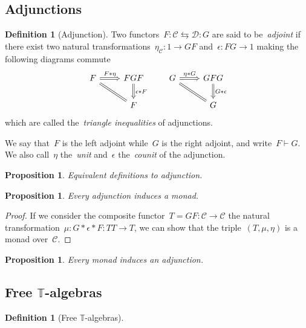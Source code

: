 \documentclass[a4paper]{article}
\theoremstyle{plain}
\newtheorem{proposition}[theorem]{Proposition}
\theoremstyle{definition}
\newtheorem{definition}[theorem]{Definition}
\newcommand{\adjoint}{\mathrel{\vdash}}
\newcommand{\cat}[1]{\mathcal{#1}}
\begin{document}
\subsection{Adjunctions}
\begin{definition}[Adjunction]
    Two functors~\(F:\cat{C}\leftrightarrows\cat{D}:G\) are said to
    be~\emph{adjoint} if there exist two natural
    transformations~\(\eta_{\cat{C}}:1\longrightarrow GF\)
    and~\(\epsilon:FG\longrightarrow 1\) making the following diagrams commute
    \[
        \begin{tikzcd}
            F \arrow[r, "F\ast\eta", Rightarrow] \arrow[dr, equal] & FGF \arrow[d, "\epsilon\ast F", Rightarrow] \\
              & F
        \end{tikzcd}
        \qquad
        \begin{tikzcd}
            G \arrow[r, "\eta\ast G", Rightarrow] \arrow[dr, equal] & GFG \arrow[d, "G\ast\epsilon", Rightarrow] \\
              & G
        \end{tikzcd}
    \]
    which are called the~\emph{triangle inequalities} of adjunctions.

    We say that~\(F\) is the left adjoint while~\(G\) is the right adjoint,
    and write~\(F\adjoint G\).
    We also call~\(\eta\) the~\emph{unit} and~\(\epsilon\) the~\emph{counit}
    of the adjunction.
\end{definition}

\begin{proposition}
    Equivalent definitions to adjunction.
\end{proposition}

\begin{proposition}
    Every adjunction induces a monad.
\end{proposition}
\begin{proof}
    If we consider the composite functor~\(T=GF:\cat{C}\longrightarrow\cat{C}\)
    the natural transformation~\(\mu:G\ast\epsilon\ast F:TT\longrightarrow T\),
    we can show that the triple~\((T,\mu,\eta)\) is a monad over~\(\cat{C}\).
\end{proof}

\begin{proposition}
    Every monad induces an adjunction.
\end{proposition}
\subsection{Free \texorpdfstring{$\mathbb{T}$}{T}-algebras}
\begin{definition}[Free $\mathbb{T}$-algebras]
\end{definition}
\end{document}
